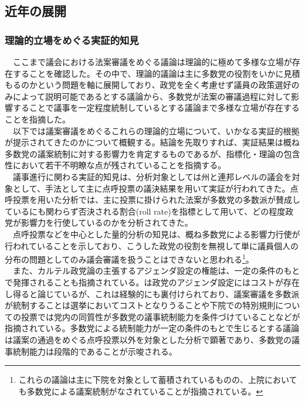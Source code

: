 \documentclass{article}
\begin{document}
\subsection{近年の展開}
\subsubsection{理論的立場をめぐる実証的知見}
　ここまで議会における法案審議をめぐる議論は理論的に極めて多様な立場が存在することを確認した。その中で、理論的議論は主に多数党の役割をいかに見積もるのかという問題を軸に展開しており、政党を全く考慮せず議員の政策選好のみによって説明可能であるとする議論\citep*{Krehbiel1998-ob,Krehbiel2010-ob}から、多数党が法案の審議過程に対して影響することで議事を一定程度統制しているとする議論\citep*{Aldrich1995-xf,Cox2005-pn,Cox2007-xq}まで多様な立場が存在することを指摘した。\\
　以下では議案審議をめぐるこれらの理論的立場について、いかなる実証的根拠が提示されてきたのかについて概観する。結論を先取りすれば、実証結果は概ね多数党の議案統制に対する影響力を肯定するものであるが、指標化・理論の包含性において若干不明瞭な点が残されていることを指摘する。\\
　議事進行に関わる実証的知見は、分析対象としては州と連邦レベルの議会を対象として、手法として主に点呼投票の議決結果を用いて実証が行われてきた。点呼投票を用いた分析では、主に投票に掛けられた法案が多数党の多数派が賛成しているにも関わらず否決される割合(roll rate)を指標として用いて、どの程度政党が影響力を行使しているのかを分析されてきた。\citep{Magleby2018-rc,Richman2020-al}\\
　点呼投票などを中心とした量的分析の知見は、概ね多数党による影響力行使が行われていることを示しており\citep*{Cox2001-eu,Lawrence2006-ed,Cox2010-gb,Meagher2012-to,Clark2012-lk}、こうした政党の役割を無視して単に議員個人の分布の問題としてのみ議会審議を扱うことはできないと思われる\footnote{これらの議論は主に下院を対象として蓄積されているものの、上院においても多数党による議案統制がなされていることが指摘されている。\citep*{Gailmard2007-yj,Hartog2008-xs}}。\\
　また、カルテル政党論の主張するアジェンダ設定の権能は、一定の条件のもとで発揮されることも指摘されている。\citet*[Ch6]{Cox2005-pn}は政党のアジェンダ設定にはコストが存在し得ると論じているが、これは経験的にも裏付けられており、議案審議を多数派が統制することは選挙においてコストとなりうること\citep*{Richman2015-xo}や下院での特別規則についての投票では党内の同質性が多数党の議事統制能力を条件づけていること\citep*{Finocchiaro2008-zh}などが指摘されている。多数党による統制能力が一定の条件のもとで生じるとする議論は議案の通過をめぐる点呼投票以外を対象とした分析で顕著であり、多数党の議事統制能力は段階的であることが示唆される。\\
\end{document}
